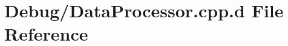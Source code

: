 \hypertarget{_debug_2_data_processor_8cpp_8d}{\section{\-Debug/\-Data\-Processor.cpp.\-d \-File \-Reference}
\label{_debug_2_data_processor_8cpp_8d}
}
